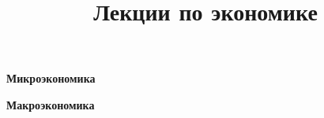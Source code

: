 \documentclass{hedlectures}
\title{Лекции по экономике}
\begin{document}
    \maketitle
    \vspace*{\fill}
    \begin{center}
        \Huge \bfseries Микроэкономика
    \end{center}
    \vspace*{\fill}
    
    
    
    
    
    
    

    \vspace*{\fill}
    \begin{center}
        \Huge \bfseries Макроэкономика
    \end{center}
    \vspace*{\fill}
    
    
    
    
    
\end{document}
